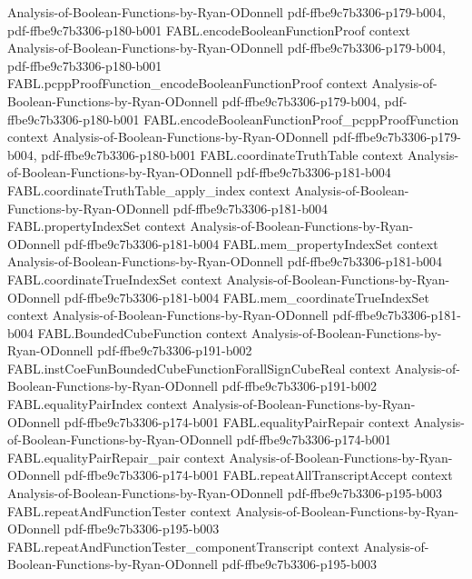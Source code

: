 \begin{theorem}
  {Analysis-of-Boolean-Functions-by-Ryan-ODonnell}
  {pdf-ffbe9c7b3306-p179-b004,
    pdf-ffbe9c7b3306-p180-b001}
\proofstep
  {FABL.encodeBooleanFunctionProof}
  {context}
  {Analysis-of-Boolean-Functions-by-Ryan-ODonnell}
  {pdf-ffbe9c7b3306-p179-b004,
    pdf-ffbe9c7b3306-p180-b001}
\proofstep
  {FABL.pcppProofFunction_encodeBooleanFunctionProof}
  {context}
  {Analysis-of-Boolean-Functions-by-Ryan-ODonnell}
  {pdf-ffbe9c7b3306-p179-b004,
    pdf-ffbe9c7b3306-p180-b001}
\proofstep
  {FABL.encodeBooleanFunctionProof_pcppProofFunction}
  {context}
  {Analysis-of-Boolean-Functions-by-Ryan-ODonnell}
  {pdf-ffbe9c7b3306-p179-b004,
    pdf-ffbe9c7b3306-p180-b001}
\proofstep
  {FABL.coordinateTruthTable}
  {context}
  {Analysis-of-Boolean-Functions-by-Ryan-ODonnell}
  {pdf-ffbe9c7b3306-p181-b004}
\proofstep
  {FABL.coordinateTruthTable_apply_index}
  {context}
  {Analysis-of-Boolean-Functions-by-Ryan-ODonnell}
  {pdf-ffbe9c7b3306-p181-b004}
\proofstep
  {FABL.propertyIndexSet}
  {context}
  {Analysis-of-Boolean-Functions-by-Ryan-ODonnell}
  {pdf-ffbe9c7b3306-p181-b004}
\proofstep
  {FABL.mem_propertyIndexSet}
  {context}
  {Analysis-of-Boolean-Functions-by-Ryan-ODonnell}
  {pdf-ffbe9c7b3306-p181-b004}
\proofstep
  {FABL.coordinateTrueIndexSet}
  {context}
  {Analysis-of-Boolean-Functions-by-Ryan-ODonnell}
  {pdf-ffbe9c7b3306-p181-b004}
\proofstep
  {FABL.mem_coordinateTrueIndexSet}
  {context}
  {Analysis-of-Boolean-Functions-by-Ryan-ODonnell}
  {pdf-ffbe9c7b3306-p181-b004}
\proofstep
  {FABL.BoundedCubeFunction}
  {context}
  {Analysis-of-Boolean-Functions-by-Ryan-ODonnell}
  {pdf-ffbe9c7b3306-p191-b002}
\proofstep
  {FABL.instCoeFunBoundedCubeFunctionForallSignCubeReal}
  {context}
  {Analysis-of-Boolean-Functions-by-Ryan-ODonnell}
  {pdf-ffbe9c7b3306-p191-b002}
\proofstep
  {FABL.equalityPairIndex}
  {context}
  {Analysis-of-Boolean-Functions-by-Ryan-ODonnell}
  {pdf-ffbe9c7b3306-p174-b001}
\proofstep
  {FABL.equalityPairRepair}
  {context}
  {Analysis-of-Boolean-Functions-by-Ryan-ODonnell}
  {pdf-ffbe9c7b3306-p174-b001}
\proofstep
  {FABL.equalityPairRepair_pair}
  {context}
  {Analysis-of-Boolean-Functions-by-Ryan-ODonnell}
  {pdf-ffbe9c7b3306-p174-b001}
\proofstep
  {FABL.repeatAllTranscriptAccept}
  {context}
  {Analysis-of-Boolean-Functions-by-Ryan-ODonnell}
  {pdf-ffbe9c7b3306-p195-b003}
\proofstep
  {FABL.repeatAndFunctionTester}
  {context}
  {Analysis-of-Boolean-Functions-by-Ryan-ODonnell}
  {pdf-ffbe9c7b3306-p195-b003}
\proofstep
  {FABL.repeatAndFunctionTester_componentTranscript}
  {context}
  {Analysis-of-Boolean-Functions-by-Ryan-ODonnell}
  {pdf-ffbe9c7b3306-p195-b003}

\end{theorem}
